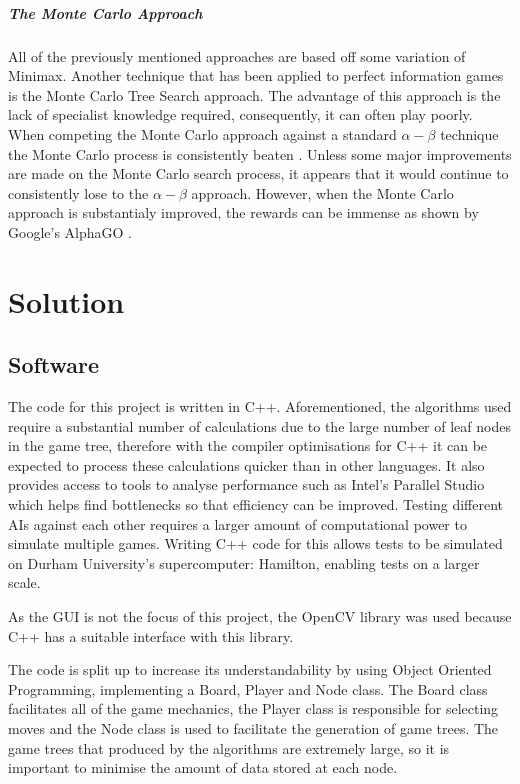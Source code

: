 \documentclass[12pt,a4paper]{article}
\begin{document}
\subparagraph*{The Monte Carlo Approach}

All of the previously mentioned approaches are based off some variation of Minimax. Another technique that has been applied to perfect information games is the Monte Carlo Tree Search approach. The advantage of this approach is the lack of specialist knowledge required, consequently, it can often play poorly. When competing the Monte Carlo approach against a standard $\alpha-\beta$ technique the Monte Carlo process is consistently beaten \cite{nijssen2007playing}. Unless some major improvements are made on the Monte Carlo search process, it appears that it would continue to consistently lose to the $\alpha-\beta$ approach. However, when the Monte Carlo approach is substantialy improved, the rewards can be immense as shown by Google's AlphaGO \cite{lee2016human}.

\section{Solution}

\subsection{Software}
The code for this project is written in C++. Aforementioned, the algorithms used require a substantial number of calculations due to the large number of leaf nodes in the game tree, therefore with the compiler optimisations for C++ it can be expected to process these calculations quicker than in other languages. It also provides access to tools to analyse performance such as Intel's Parallel Studio which helps find bottlenecks so that efficiency can be improved. Testing different AIs against each other requires a larger amount of computational power to simulate multiple games. Writing C++ code for this allows tests to be simulated on Durham University's  supercomputer: Hamilton, enabling tests on a larger scale.

As the GUI is not the focus of this project, the OpenCV  library was used because C++ has a suitable interface with this library.

The code is split up to increase its understandability by using Object Oriented Programming, implementing a Board, Player and Node class. The Board class facilitates all of the game mechanics, the Player class is responsible for selecting moves and the Node class is used to facilitate the generation of game trees. The game trees that produced by the algorithms are extremely large, so it is important to minimise the amount of data stored at each node.
\end{document}
